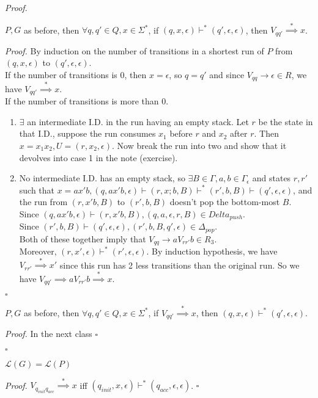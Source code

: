 \documentclass[a4paper]{article}
\newenvironment{proof}{\begin{breakbox}\textit{Proof.}}{\hfill$\square$\end{breakbox}}
\newcommand{\nl}{\vspace{0.2cm}\\}
\newcommand{\mc}{\mathcal}
\renewcommand{\L}{\mc{L}}
\newcommand{\produces}{\implies}
\newcommand{\derives}{\stackrel{*}{\implies}}
\newcommand{\changesto}{\vdash}
\begin{document}
\begin{proof}
    \begin{claim}
        $P, G$ as before, then $\forall q, q' \in Q, x \in \Sigma^*$, if $(q, x, \epsilon) \changesto^* (q', \epsilon, \epsilon)$, then $V_{qq'} \derives x$.
    \end{claim}
    \begin{proof}
        By induction on the number of transitions in a shortest run of $P$ from $(q, x, \epsilon)$ to $(q', \epsilon, \epsilon)$.\nl
        If the number of transitions is $0$, then $x = \epsilon$, so $q = q'$ and since $V_{qq} \to \epsilon \in R$, we have $V_{qq'} \derives x$.\nl
        If the number of transitions is more than 0.
        \begin{enumerate}
            \item $\exists$ an intermediate I.D. in the run having an empty stack. Let $r$ be the state in that I.D., suppose the run consumes $x_1$ before $r$ and $x_2$ after $r$.
                Then $x = x_1x_2, U = (r, x_2, \epsilon)$. Now break the run into two and show that it devolves into case 1 in the note (exercise).
            \item No intermediate I.D. has an empty stack, so $\exists B \in \Gamma, a, b \in \Gamma_\epsilon$ and states $r, r'$ such that $x = ax'b, (q, ax'b, \epsilon) \changesto (r, x;b, B)
                \changesto^* (r', b, B) \changesto (q', \epsilon, \epsilon)$, and the run from $(r, x'b, B)$ to $(r', b, B)$ doesn't pop the bottom-most $B$.\nl
                Since $(q, ax'b, \epsilon) \changesto (r, x'b, B), (q, a, \epsilon, r, B) \in Delta_{push}$.\nl
                Since $(r', b, B) \changesto (q', \epsilon, \epsilon), (r', b, B, q', \epsilon) \in \Delta_{pop}$.\nl
                Both of these together imply that $V_{qq} \to aV_{rr'}b \in R_3$.\nl
                Moreover, $(r, x', \epsilon) \changesto^* (r', \epsilon, \epsilon)$.
                By induction hypothesis, we have $V_{rr'} \derives x'$ since this run has 2 less transitions than the original run.
                So we have $V_{qq'} \produces aV_{rr'}b \derives x$.
        \end{enumerate}
    \end{proof}
    \begin{claim}
        $P, G$ as before, then $\forall q, q' \in Q, x \in \Sigma^*$, if $V_{qq'} \derives x$, then $(q, x, \epsilon) \changesto^* (q', \epsilon, \epsilon)$.
    \end{claim}
    \begin{proof}
        In the next class
    \end{proof}
\end{proof}

\begin{cor}
    $\L(G) = \L(P)$
\end{cor}

\begin{proof}
    $V_{q_{init}q_{acc}} \derives x$ iff $(q_{init}, x, \epsilon) \changesto^* (q_{acc}, \epsilon, \epsilon)$.
\end{proof}
\end{document}
